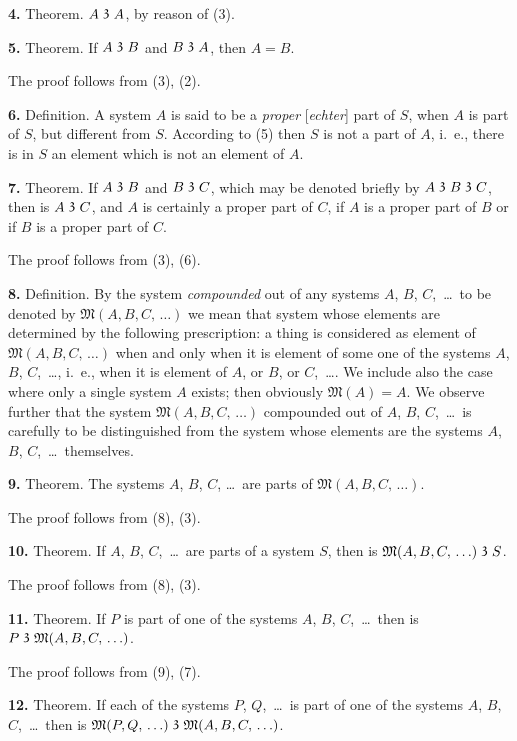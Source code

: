 \documentclass[oneside]{book}
\newcommand\partof{\mathrel{\raisebox{0.45ex}{$\mathfrak{3}$}}}   %
\newcommand\mypara{\medskip\textbf}
\begin{document}
\mypara{4.} Theorem.  $A \partof A$, by reason of (3).

\mypara{5.} Theorem.  If $A \partof B$ and $B \partof A$, then $A = B$.

The proof follows from (3), (2).

\mypara{6.} Definition. A system $A$ is said to be a \textit{proper}
[\textit{echter}] part of $S$, when $A$ is part of $S$, but different
from $S$.  According to (5) then $S$ is not a part of $A$,
i.~e., there is in $S$ an element which is not an element
of $A$.

\mypara{7.} Theorem.  If $A \partof B$ and $B \partof C$, which may be
denoted briefly by $A \partof B \partof C$, then is $A \partof C$, and $A$ is
certainly a proper part of $C$, if $A$ is a proper part of
$B$ or if $B$ is a proper part of $C$.

The proof follows from (3), (6).

\mypara{8.} Definition.  By the system \textit{compounded} out of
any systems $A$, $B$, $C$,~\ldots\ to be denoted by $\mathfrak{M}(A, B,
C,\,\ldots)$ we mean that system whose elements are determined
by the following prescription: a thing is
considered as element of $\mathfrak{M}(A, B, C,\,\ldots)$ when and
only when it is element of some one of the systems
$A$, $B$, $C$,~\ldots, i.~e., when it is element of $A$, or $B$, or
$C$,~\ldots. We include also the case where only a single
system $A$ exists; then obviously $\mathfrak{M}(A)=A$. We
observe further that the system $\mathfrak{M}(A, B, C,\,\ldots)$
compounded out of $A$, $B$, $C$,~\ldots\ is carefully to be distinguished
from the system whose elements are the
systems $A$, $B$, $C$,~\ldots\ themselves.

\mypara{9.} Theorem. The systems $A$, $B$, $C$, \ldots\ are parts
of $\mathfrak{M}(A, B, C,\,\ldots)$.

The proof follows from (8), (3).

\mypara{10.} Theorem.  If $A$, $B$, $C$,~\ldots\ are parts of a system
$S$, then is $\mathfrak{M}(A, B, C,\,\ldots)\\ \partof S$.

The proof follows from (8), (3).

\mypara{11.} Theorem.  If $P$ is part of one of the systems
$A$, $B$, $C$,~\ldots\ then is $P \partof \mathfrak{M}(A, B, C,\,\ldots)$.

The proof follows from (9), (7).

\mypara{12.} Theorem.  If each of the systems $P$, $Q$,~\ldots\
is part of one of the systems $A$, $B$, $C$,~\ldots\ then is
$\mathfrak{M}(P, Q,\,\ldots) \partof \mathfrak{M}(A, B, C,\,\ldots)$.
\end{document}
